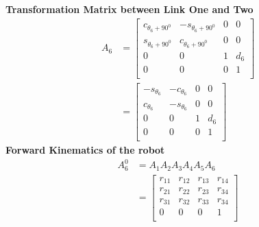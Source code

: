 \documentclass[12pt,a4paper]{article}
\begin{document}
	\textbf{Transformation Matrix between Link One and Two}
	\begin{align*}
	A_6 &= \begin{bmatrix}
		 c_{\theta_6 + 90^0} & -s_{\theta_6 + 90^0} & 0 & 0\\
		 s_{\theta_6 + 90^0} & c_{\theta_6 + 90^0} & 0 & 0\\
		 0 & 0 & 1 & d_6\\
		 0 & 0 & 0 & 1\\
		\end{bmatrix} \\
		&= \begin{bmatrix}
		 -s_{\theta_6} & -c_{\theta_6} & 0 & 0\\
		 c_{\theta_6} & -s_{\theta_6} & 0 & 0\\
		 0 & 0 & 1 & d_6\\
		 0 & 0 & 0 & 1\\
		\end{bmatrix}
	\end{align*}
\textbf{Forward Kinematics of the robot}
\begin{align*}
A^0_6 &= A_1A_2A_3A_4A_5A_6 \\
&=  \begin{bmatrix}
	r_{11} & r_{12} & r_{13} & r_{14} \\
	r_{21} & r_{22} & r_{23} & r_{34} \\
	r_{31} & r_{32} & r_{33} & r_{34} \\
	0 & 0 & 0 & 1 \\
\end{bmatrix} \\
\end{align*}
\end{document}
